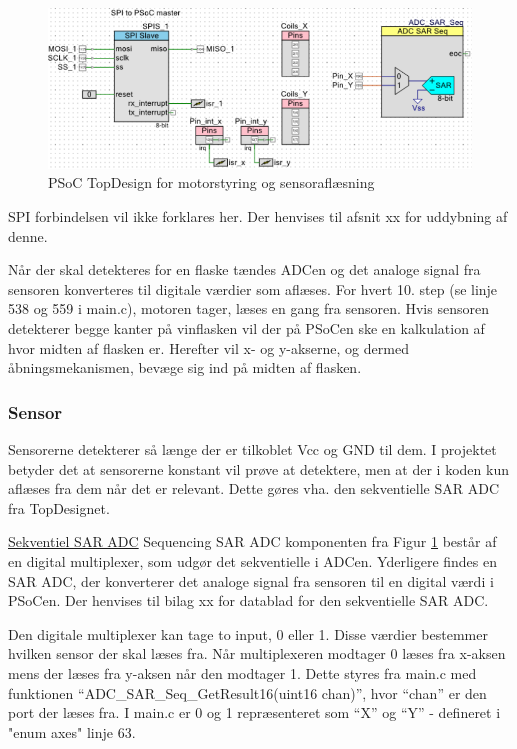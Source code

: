 \begin{figure}[H]
	\centering
\includegraphics[scale=0.45]{Screenshots/PSoC_TopDesign_X_Y.png}
\caption{PSoC TopDesign for motorstyring og sensoraflæsning}
\label{PSoC_TopDesign_X_Y}
\end{figure}

SPI forbindelsen vil ikke forklares her. Der henvises til afsnit xx for uddybning af denne.

Når der skal detekteres for en flaske tændes ADCen og det analoge signal fra sensoren konverteres til digitale værdier som aflæses. For hvert 10. step (se linje 538 og 559 i main.c), motoren tager, læses en gang fra sensoren. Hvis sensoren detekterer begge kanter på vinflasken vil der på PSoCen ske en kalkulation af hvor midten af flasken er. Herefter vil x- og y-akserne, og dermed åbningsmekanismen, bevæge sig ind på midten af flasken.

\subsubsection{Sensor}
Sensorerne detekterer så længe der er tilkoblet Vcc og GND til dem. I projektet betyder det at sensorerne konstant vil prøve at detektere, men at der i koden kun aflæses fra dem når det er relevant. Dette gøres vha. den sekventielle SAR ADC fra TopDesignet.

\underline{Sekventiel SAR ADC}
Sequencing SAR ADC komponenten fra Figur \ref{PSoC_TopDesign_X_Y} består af en digital multiplexer, som udgør det sekventielle i ADCen. Yderligere findes en SAR ADC, der konverterer det analoge signal fra sensoren til en digital værdi i PSoCen. Der henvises til bilag xx for datablad for den sekventielle SAR ADC.

Den digitale multiplexer kan tage to input, 0 eller 1. Disse værdier bestemmer hvilken sensor der skal læses fra. Når multiplexeren modtager 0 læses fra x-aksen mens der læses fra y-aksen når den modtager 1. Dette styres fra main.c med funktionen ``ADC\_SAR\_Seq\_GetResult16(uint16 chan)'', hvor ``chan'' er den port der læses fra. I main.c er 0 og 1 repræsenteret som ``X'' og ``Y'' - defineret i "enum axes" linje 63.


